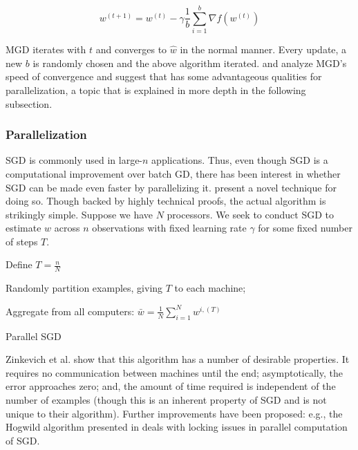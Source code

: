 \documentclass{article}
\begin{document}
\begin{equation}
	w^{(t+1)} = w^{(t)} - \gamma \frac{1}{b} \sum_{i=1}^b \nabla f(w^{(t)})
\end{equation}

MGD iterates with $t$ and converges to $\hat{w}$ in the normal manner. Every
update, a new $b$ is randomly chosen and the above algorithm iterated. 
\cite{dekel2012optimal} and \cite{li2014efficient} analyze MGD's speed of
convergence and suggest that has some advantageous qualities for
parallelization, a topic that is explained in more depth in the following
subsection.

\subsubsection{Parallelization}

SGD is commonly used in large-$n$ applications. Thus,
even though SGD is a computational improvement over batch GD, there has been
interest in whether SGD can be made even faster by parallelizing it.
\cite{zinkevich2010parallelized} present a novel technique for doing so. Though backed
by highly technical proofs, the actual algorithm is strikingly simple. Suppose we have $N$ processors. We seek to
conduct SGD to estimate $w$ across $n$ observations with fixed learning rate
$\gamma$ for some fixed number of steps $T$.

\medskip

\begin{algorithm}[H]
	Define $T = \frac{n}{N}$\;

	Randomly partition examples, giving $T$ to each machine;\

	Aggregate from all computers: $\bar{w} = \frac{1}{N} \sum_{i=1}^{N}
	w^{i, (T)}$ \;


	\caption{Parallel SGD}
\end{algorithm}

\medskip

Zinkevich et al. show that this algorithm has a number of desirable properties.
It requires no communication between machines until the end; asymptotically, the
error approaches zero; and, the amount of time required is independent of the number of
examples (though this is an inherent property of SGD and is not unique to their
algorithm). Further improvements have been proposed: e.g., the Hogwild algorithm
presented in \cite{recht2011hogwild} deals with locking issues in parallel
computation of SGD.
\end{document}
